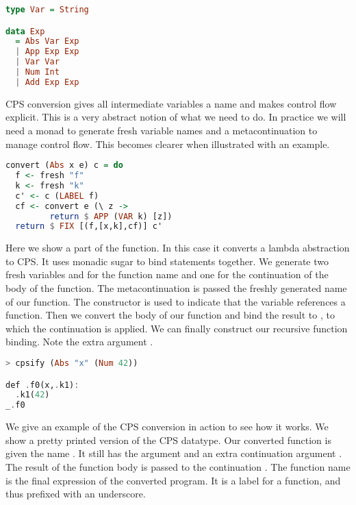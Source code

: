 \begin{lstlisting}[language=Haskell]
type Var = String

data Exp
  = Abs Var Exp
  | App Exp Exp
  | Var Var
  | Num Int
  | Add Exp Exp
\end{lstlisting}

\ac{CPS} conversion gives all intermediate variables a name and makes control flow explicit. This is a very abstract notion of what we need to do. In practice we will need a monad to generate fresh variable names and a metacontinuation to manage control flow. This becomes clearer when illustrated with an example.

\begin{lstlisting}[language=Haskell]
convert (Abs x e) c = do
  f <- fresh "f"
  k <- fresh "k"
  c' <- c (LABEL f)
  cf <- convert e (\ z ->
         return $ APP (VAR k) [z])
  return $ FIX [(f,[x,k],cf)] c'
\end{lstlisting}

Here we show a part of the  function. In this case it converts a lambda abstraction to \ac{CPS}. It uses monadic sugar to bind statements together. We generate two fresh variables  and  for the function name and one for the continuation of the body of the function. The metacontinuation  is passed the freshly generated name of our function. The  constructor is used to indicate that the variable references a function. Then we convert the body of our function and bind the result to , to which the continuation  is applied. We can finally construct our recursive function binding. Note the extra argument .

\begin{lstlisting}[language=Haskell]
> cpsify (Abs "x" (Num 42))

def .f0(x,.k1):
  .k1(42)
_.f0
\end{lstlisting}

We give an example of the \ac{CPS} conversion in action to see how it works. We show a pretty printed version of the \ac{CPS} datatype. Our converted function is given the name . It still has the argument  and an extra continuation argument . The result of the function body is passed to the continuation . The function name is the final expression of the converted program. It is a label for a function, and thus prefixed with an underscore.

